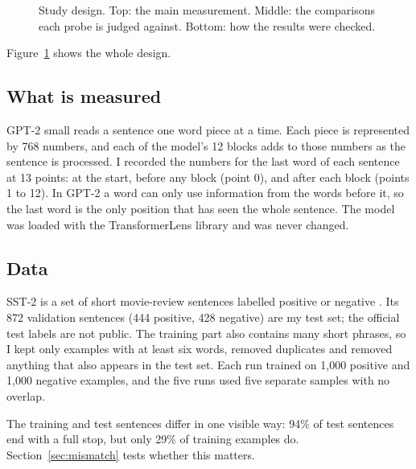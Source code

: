 \documentclass[10pt,twocolumn]{article}
\begin{document}
\begin{figure}[t]
\caption{Study design. Top: the main measurement. Middle: the comparisons each probe is judged against. Bottom: how the results were checked.}
\label{fig:pipeline}
\end{figure}

Figure~\ref{fig:pipeline} shows the whole design.

\subsection{What is measured}
GPT-2 small reads a sentence one word piece at a time. Each piece is represented by 768 numbers, and each of the model's 12 blocks adds to those numbers as the sentence is processed. I recorded the numbers for the last word of each sentence at 13 points: at the start, before any block (point 0), and after each block (points 1 to 12). In GPT-2 a word can only use information from the words before it, so the last word is the only position that has seen the whole sentence. The model was loaded with the TransformerLens library \citep{nanda2022transformerlens} and was never changed.

\subsection{Data}
SST-2 is a set of short movie-review sentences labelled positive or negative \citep{socher-etal-2013-recursive}. Its 872 validation sentences (444 positive, 428 negative) are my test set; the official test labels are not public. The training part also contains many short phrases, so I kept only examples with at least six words, removed duplicates and removed anything that also appears in the test set. Each run trained on 1,000 positive and 1,000 negative examples, and the five runs used five separate samples with no overlap.

The training and test sentences differ in one visible way: 94\% of test sentences end with a full stop, but only 29\% of training examples do. Section~\ref{sec:mismatch} tests whether this matters.
\end{document}
